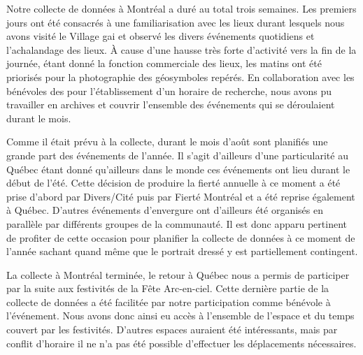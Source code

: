 Notre collecte de données à Montréal a duré au total trois semaines.
Les premiers jours ont été consacrés à une familiarisation avec les lieux durant lesquels nous avons visité le Village gai et observé les divers événements quotidiens et l'achalandage des lieux.
À cause d'une hausse très forte d'activité vers la fin de la journée, étant donné la fonction commerciale des lieux, les matins ont été priorisés pour la photographie des géosymboles repérés.
En collaboration avec les bénévoles des \agq{} pour l'établissement d'un horaire de recherche, nous avons pu travailler en archives et couvrir l'ensemble des événements \lgbt{} qui se déroulaient durant le mois.

Comme il était prévu à la collecte, durant le mois d'août sont planifiés une grande part des événements \lgbt{} de l'année.
Il s'agit d'ailleurs d'une particularité au Québec étant donné qu'ailleurs dans le monde ces événements ont lieu durant le début de l'été.
Cette décision de produire la fierté annuelle à ce moment a été prise d'abord par Divers/Cité puis par Fierté Montréal et a été reprise également à Québec.
D'autres événements d'envergure ont d'ailleurs été organisés en parallèle par différents groupes de la communauté.
Il est donc apparu pertinent de profiter de cette occasion pour planifier la collecte de données à ce moment de l'année sachant quand même que le portrait dressé y est partiellement contingent.

La collecte à Montréal terminée, le retour à Québec nous a permis de participer par la suite aux festivités de la Fête Arc-en-ciel.
Cette dernière partie de la collecte de données a été facilitée par notre participation comme bénévole à l'événement.
Nous avons donc ainsi eu accès à l'ensemble de l'espace et du temps couvert par les festivités.
D'autres espaces auraient été intéressants, mais par conflit d'horaire il ne n'a pas été possible d'effectuer les déplacements nécessaires.

